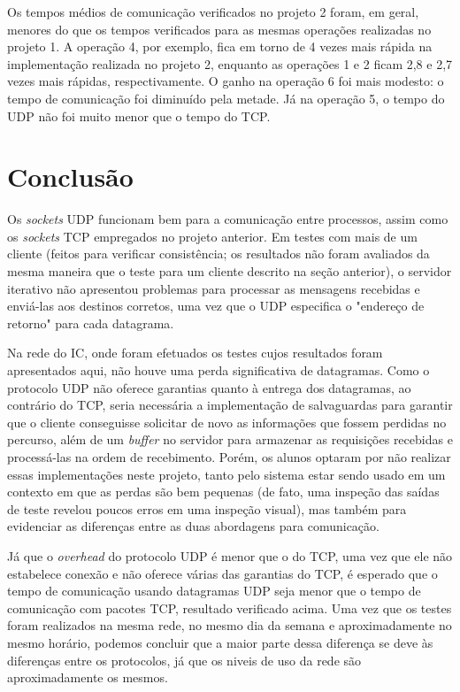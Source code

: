 \documentclass[11pt, brazil]{article} %
\begin{document}
Os tempos médios de comunicação verificados no projeto 2 foram, em geral, menores do que os tempos verificados para as mesmas operações realizadas no projeto 1. A operação 4, por exemplo, fica em torno de 4 vezes mais rápida na implementação realizada no projeto 2, enquanto as operações 1 e 2 ficam 2,8 e 2,7 vezes mais rápidas, respectivamente. O ganho na operação 6 foi mais modesto: o tempo de comunicação foi diminuído pela metade. Já na operação 5, o tempo do UDP não foi muito menor que o tempo do TCP.


\section{Conclusão}

Os \emph{sockets} UDP funcionam bem para a comunicação entre processos, assim como os \emph{sockets} TCP empregados no projeto anterior. 
Em testes com mais de um cliente (feitos para verificar consistência; os resultados não foram avaliados da mesma maneira que o teste para um cliente descrito na seção anterior), o servidor iterativo não apresentou problemas para processar as mensagens recebidas e enviá-las aos destinos corretos, uma vez que o UDP especifica o "endereço de retorno" para cada datagrama. 

Na rede do IC, onde foram efetuados os testes cujos resultados foram apresentados aqui, não houve uma perda significativa de datagramas. 
Como o protocolo UDP não oferece garantias quanto à entrega dos datagramas, ao contrário do TCP, seria necessária a implementação de salvaguardas para garantir que o cliente conseguisse solicitar de novo as informações que fossem perdidas no percurso, além de um \emph{buffer} no servidor para armazenar as requisições recebidas e processá-las na ordem de recebimento.
Porém, os alunos optaram por não realizar essas implementações neste projeto, tanto pelo sistema estar sendo usado em um contexto em que as perdas são bem pequenas (de fato, uma inspeção das saídas de teste revelou poucos erros em uma inspeção visual), mas também para evidenciar as diferenças entre as duas abordagens para comunicação.

Já que o \emph{overhead} do protocolo UDP é menor que o do TCP, uma vez que ele não estabelece conexão e não oferece várias das garantias do TCP, é esperado que o tempo de comunicação usando datagramas UDP seja menor que o tempo de comunicação com pacotes TCP, resultado verificado acima. 
Uma vez que os testes foram realizados na mesma rede, no mesmo dia da semana e aproximadamente no mesmo horário, podemos concluir que a maior parte dessa diferença se deve às diferenças entre os protocolos, já que os niveis de uso da rede são aproximadamente os mesmos.
\end{document}
